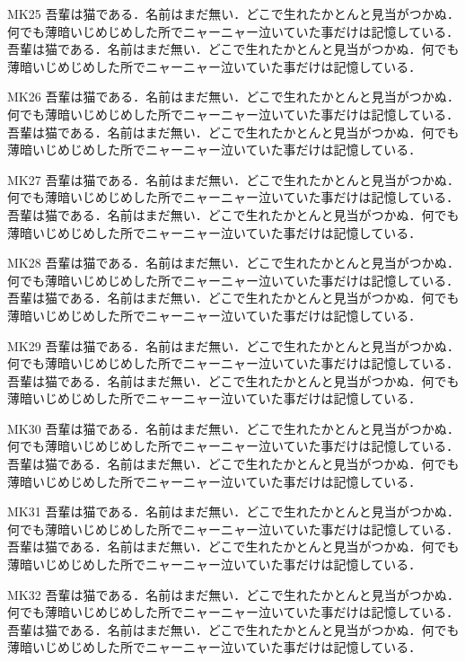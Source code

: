 \documentclass[fontsize=10pt,twocolumn]{jlreq}
\begin{document}
MK25 吾輩は猫である．名前はまだ無い．どこで生れたかとんと見当がつかぬ．何でも薄暗いじめじめした所でニャーニャー泣いていた事だけは記憶している． 吾輩は猫である．名前はまだ無い．どこで生れたかとんと見当がつかぬ．何でも薄暗いじめじめした所でニャーニャー泣いていた事だけは記憶している．\par
{}MK26 吾輩は猫である．名前はまだ無い．どこで生れたかとんと見当がつかぬ．何でも薄暗いじめじめした所でニャーニャー泣いていた事だけは記憶している． 吾輩は猫である．名前はまだ無い．どこで生れたかとんと見当がつかぬ．何でも薄暗いじめじめした所でニャーニャー泣いていた事だけは記憶している．\par
{}MK27 吾輩は猫である．名前はまだ無い．どこで生れたかとんと見当がつかぬ．何でも薄暗いじめじめした所でニャーニャー泣いていた事だけは記憶している． 吾輩は猫である．名前はまだ無い．どこで生れたかとんと見当がつかぬ．何でも薄暗いじめじめした所でニャーニャー泣いていた事だけは記憶している．\par
{}MK28 吾輩は猫である．名前はまだ無い．どこで生れたかとんと見当がつかぬ．何でも薄暗いじめじめした所でニャーニャー泣いていた事だけは記憶している． 吾輩は猫である．名前はまだ無い．どこで生れたかとんと見当がつかぬ．何でも薄暗いじめじめした所でニャーニャー泣いていた事だけは記憶している．\par
{}MK29 吾輩は猫である．名前はまだ無い．どこで生れたかとんと見当がつかぬ．何でも薄暗いじめじめした所でニャーニャー泣いていた事だけは記憶している． 吾輩は猫である．名前はまだ無い．どこで生れたかとんと見当がつかぬ．何でも薄暗いじめじめした所でニャーニャー泣いていた事だけは記憶している．\par
{}MK30 吾輩は猫である．名前はまだ無い．どこで生れたかとんと見当がつかぬ．何でも薄暗いじめじめした所でニャーニャー泣いていた事だけは記憶している． 吾輩は猫である．名前はまだ無い．どこで生れたかとんと見当がつかぬ．何でも薄暗いじめじめした所でニャーニャー泣いていた事だけは記憶している．\par
{}
MK31 吾輩は猫である．名前はまだ無い．どこで生れたかとんと見当がつかぬ．何でも薄暗いじめじめした所でニャーニャー泣いていた事だけは記憶している． 吾輩は猫である．名前はまだ無い．どこで生れたかとんと見当がつかぬ．何でも薄暗いじめじめした所でニャーニャー泣いていた事だけは記憶している．\par
{}MK32 吾輩は猫である．名前はまだ無い．どこで生れたかとんと見当がつかぬ．何でも薄暗いじめじめした所でニャーニャー泣いていた事だけは記憶している． 吾輩は猫である．名前はまだ無い．どこで生れたかとんと見当がつかぬ．何でも薄暗いじめじめした所でニャーニャー泣いていた事だけは記憶している．\par
\end{document}
